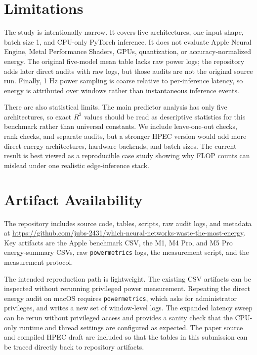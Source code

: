 \documentclass[conference]{IEEEtran}
\begin{document}
\section{Limitations}

The study is intentionally narrow. It covers five architectures, one input
shape, batch size 1, and CPU-only PyTorch inference. It does not evaluate
Apple Neural Engine, Metal Performance Shaders, GPUs, quantization, or
accuracy-normalized energy. The original five-model mean table lacks raw
power logs; the repository adds later direct audits with raw logs, but those
audits are not the original source run. Finally, 1 Hz power sampling is coarse
relative to per-inference latency, so energy is attributed over windows rather
than instantaneous inference events.

There are also statistical limits. The main predictor analysis has only five
architectures, so exact $R^2$ values should be read as descriptive statistics
for this benchmark rather than universal constants. We include leave-one-out
checks, rank checks, and separate audits, but a stronger HPEC version would
add more direct-energy architectures, hardware backends, and batch sizes. The
current result is best viewed as a reproducible case study showing why FLOP
counts can mislead under one realistic edge-inference stack.

\section{Artifact Availability}

\begin{sloppypar}
The repository includes source code, tables, scripts, raw audit logs, and
metadata at
\url{https://github.com/jubs-2431/which-neural-networks-waste-the-most-energy}.
Key artifacts are the Apple benchmark CSV, the M1, M4 Pro, and M5 Pro
energy-summary CSVs, raw
\texttt{powermetrics} logs, the measurement script, and the measurement
protocol.
\end{sloppypar}

The intended reproduction path is lightweight. The existing CSV artifacts can
be inspected without rerunning privileged power measurement. Repeating the
direct energy audit on macOS requires \texttt{powermetrics}, which asks for
administrator privileges, and writes a new set of window-level logs. The
expanded latency sweep can be rerun without privileged access and provides a
sanity check that the CPU-only runtime and thread settings are configured as
expected. The paper source and compiled HPEC draft are included so that the
tables in this submission can be traced directly back to repository artifacts.
\end{document}
